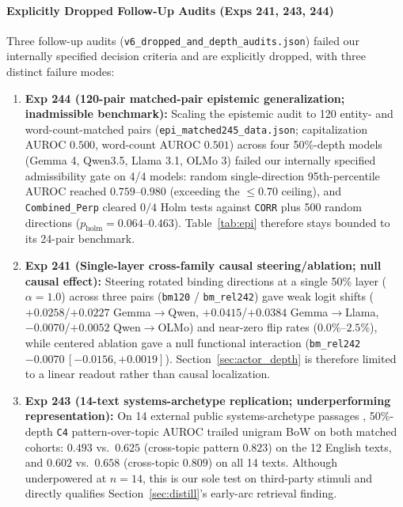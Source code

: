 \documentclass[conference]{IEEEtran}
\begin{document}
\paragraph*{Explicitly Dropped Follow-Up Audits (Exps 241, 243, 244)}
Three follow-up audits (\texttt{v6\_dropped\_and\_depth\_audits.json}) failed our internally specified decision criteria and are explicitly dropped, with three distinct failure modes:
\begin{enumerate}
  \item \textbf{Exp 244 (120-pair matched-pair epistemic generalization; inadmissible benchmark):} Scaling the epistemic audit to 120 entity- and word-count-matched pairs (\texttt{epi\_matched245\_data.json}; capitalization AUROC $0.500$, word-count AUROC $0.501$) across four 50\%-depth models (Gemma 4, Qwen3.5, Llama 3.1, OLMo 3) failed our internally specified admissibility gate on 4/4 models: random single-direction 95th-percentile AUROC reached $0.759$--$0.980$ (exceeding the $\le 0.70$ ceiling), and \texttt{Combined\_Perp} cleared $0/4$ Holm tests against \texttt{CORR} plus 500 random directions ($p_{\text{holm}}=0.064$--$0.463$). Table~\ref{tab:epi} therefore stays bounded to its 24-pair benchmark.
  \item \textbf{Exp 241 (Single-layer cross-family causal steering/ablation; null causal effect):} Steering rotated binding directions at a single 50\% layer ($\alpha=1.0$) across three pairs (\texttt{bm120} / \texttt{bm\_rel242}) gave weak logit shifts ($+0.0258$/$+0.0227$ Gemma$\to$Qwen, $+0.0415$/$+0.0384$ Gemma$\to$Llama, $-0.0070$/$+0.0052$ Qwen$\to$OLMo) and near-zero flip rates ($0.0\%$--$2.5\%$), while centered ablation gave a null functional interaction (\texttt{bm\_rel242} $-0.0070\,[-0.0156,+0.0019]$). Section~\ref{sec:actor_depth} is therefore limited to a linear readout rather than causal localization.
  \item \textbf{Exp 243 (14-text systems-archetype replication; underperforming representation):} On 14 external public systems-archetype passages \cite{nordfors2026archetypal,senge1990fifth}, 50\%-depth \texttt{C4} pattern-over-topic AUROC trailed unigram BoW on both matched cohorts: $0.493$ vs.\ $0.625$ (cross-topic pattern $0.823$) on the 12 English texts, and $0.602$ vs.\ $0.658$ (cross-topic $0.809$) on all 14 texts. Although underpowered at $n=14$, this is our sole test on third-party stimuli and directly qualifies Section~\ref{sec:distill}'s early-arc retrieval finding.
\end{enumerate}
\end{document}
